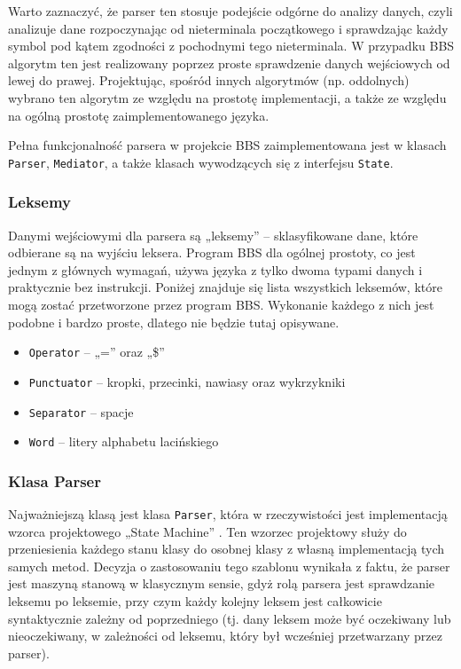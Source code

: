 Warto zaznaczyć, że parser ten stosuje podejście odgórne do analizy danych, czyli analizuje dane rozpoczynając od nieterminala początkowego i sprawdzając każdy symbol pod kątem zgodności z pochodnymi tego nieterminala. W przypadku BBS algorytm ten jest realizowany poprzez proste sprawdzenie danych wejściowych od lewej do prawej. Projektując, spośród innych algorytmów (np. oddolnych) wybrano ten algorytm ze względu na prostotę implementacji, a także ze względu na ogólną prostotę zaimplementowanego języka.

Pełna funkcjonalność parsera w projekcie BBS zaimplementowana jest w klasach \texttt{Parser}, \texttt{Mediator}, a także klasach wywodzących się z interfejsu \texttt{State}.

\subsubsection{Leksemy}

Danymi wejściowymi dla parsera są „leksemy” -- sklasyfikowane dane, które odbierane są na wyjściu leksera. Program BBS dla ogólnej prostoty, co jest jednym z głównych wymagań, używa języka z tylko dwoma typami danych i praktycznie bez instrukcji. Poniżej znajduje się lista wszystkich leksemów, które mogą zostać przetworzone przez program BBS. Wykonanie każdego z nich jest podobne i bardzo proste, dlatego nie będzie tutaj opisywane.

\begin{itemize}
	\item \texttt{Operator} -- „=” oraz „\$”
	\item \texttt{Punctuator} -- kropki, przecinki, nawiasy oraz wykrzykniki
	\item \texttt{Separator} -- spacje
	\item \texttt{Word} -- litery alphabetu lacińskiego
\end{itemize}

\subsubsection{Klasa Parser}

Najważniejszą klasą jest klasa \texttt{Parser}, która w rzeczywistości jest implementacją wzorca projektowego „State Machine” \cite{state}. Ten wzorzec projektowy służy do przeniesienia każdego stanu klasy do osobnej klasy z własną implementacją tych samych metod. Decyzja o zastosowaniu tego szablonu wynikała z faktu, że parser jest maszyną stanową w klasycznym sensie, gdyż rolą parsera jest sprawdzanie leksemu po leksemie, przy czym każdy kolejny leksem jest całkowicie syntaktycznie zależny od poprzedniego (tj. dany leksem może być oczekiwany lub nieoczekiwany, w zależności od leksemu, który był wcześniej przetwarzany przez parser).

